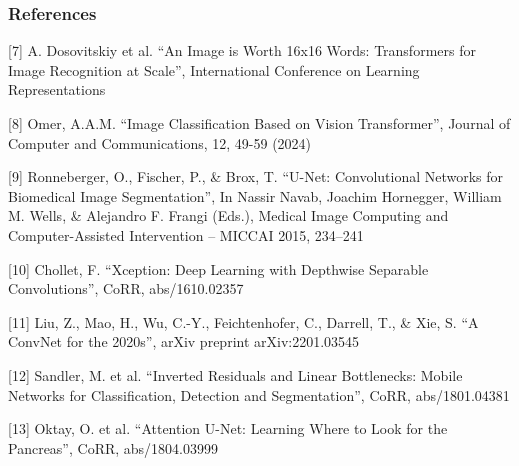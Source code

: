 \documentclass[../presentation.tex]{subfiles} %
\begin{document}
\begin{frame}

    \frametitle{References}

	{\fontsize{8pt}{7.2}\selectfont

    [7] A. Dosovitskiy et al. ``An Image is Worth 16x16 Words: Transformers for Image Recognition at Scale'', International Conference on Learning Representations \\
	\vspace{0.7em}

    [8] Omer, A.A.M. ``Image Classification Based on Vision Transformer'', Journal of Computer and Communications, 12, 49-59 (2024) \\
	\vspace{0.7em}

    [9] Ronneberger, O., Fischer, P., \& Brox, T. ``U-Net: Convolutional Networks for Biomedical Image Segmentation'', In Nassir Navab, Joachim Hornegger, William M. Wells, \& Alejandro F. Frangi (Eds.), Medical Image Computing and Computer-Assisted Intervention -- MICCAI 2015, 234--241 \\
	\vspace{0.7em}

    [10] Chollet, F. ``Xception: Deep Learning with Depthwise Separable Convolutions'', CoRR, abs/1610.02357 \\
	\vspace{0.7em}

	[11] Liu, Z., Mao, H., Wu, C.-Y., Feichtenhofer, C., Darrell, T., \& Xie, S. ``A ConvNet for the 2020s'', arXiv preprint arXiv:2201.03545 \\
	\vspace{0.7em}

	[12] Sandler, M. et al. ``Inverted Residuals and Linear Bottlenecks: Mobile Networks for Classification, Detection and Segmentation'', CoRR, abs/1801.04381 \\
	\vspace{0.7em}

	[13] Oktay, O. et al. ``Attention U-Net: Learning Where to Look for the Pancreas'', CoRR, abs/1804.03999 \\

	}

\end{frame}
\end{document}
